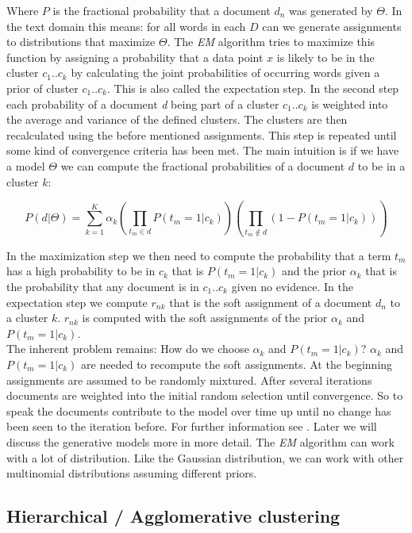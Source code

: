     Where $P$ is the fractional probability that a document $d_n$ was generated by $\Theta$. In the text domain this means: for all words in each $D$ can we generate assignments to distributions that maximize $\Theta$.
    The \emph{EM} algorithm tries to maximize this function by assigning a probability that a data point $x$ is likely to be in the cluster $c_1..c_k$ by calculating the joint probabilities of occurring words given a prior of cluster $c_1..c_k$. This is also called the expectation step. In the second step each probability of a document \emph{d} being part of a cluster $c_1..c_k$ is weighted into the average and variance of the defined clusters. The clusters are then recalculated using the before mentioned assignments. This step is repeated until some kind of convergence criteria has been met. The main intuition is if we have a model $\Theta$ we can compute the fractional probabilities of a document $d$ to be in a cluster $k$:

      \begin{equation}
        P(d|\Theta) = \sum_{k=1}^{K}\alpha_k\left ( \prod_{t_m \in d} P(t_m = 1|c_k) \right ) \left ( \prod_{t_m \not\in d} (1 - P(t_m = 1|c_k)) \right )
      \end{equation}

    In the maximization step we then need to compute the probability that a term $t_m$ has a high probability to be in $c_k$ that is $P(t_m = 1|c_k)$ and the prior $\alpha_k$ that is the probability that any document is in $c_1..c_k$ given no evidence. In the expectation step we compute $r_{nk}$ that is the soft assignment of a document $d_n$ to a cluster $k$. $r_{nk}$ is computed with the soft assignments of the prior $\alpha_k$ and $P(t_m = 1|c_k)$.\\
    The inherent problem remains: How do we choose $\alpha_k$ and $P(t_m = 1|c_k)$? $\alpha_k$ and $P(t_m = 1|c_k)$ are needed to recompute the soft assignments. At the beginning assignments are assumed to be randomly mixtured. After several iterations documents are weighted into the initial random selection until convergence. So to speak the documents contribute to the model over time up until no change has been seen to the iteration before. For further information see \cite{IRBookStanford2008}. Later we will discuss the generative models more in more detail. The \emph{EM} algorithm can work with a lot of distribution. Like the Gaussian distribution, we can work with other multinomial distributions assuming different priors.

  \subsection{Hierarchical / Agglomerative clustering}
  \label{sec:hierrachical}

